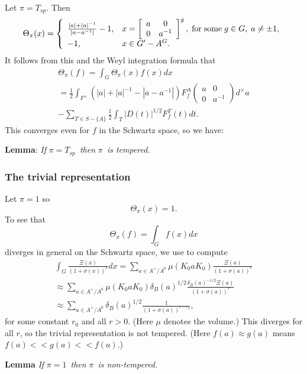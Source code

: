 \documentclass[11pt, a4paper]{article}
\begin{document}
Let $\pi =T_{sp}$. Then
\[
\Theta _\pi (x)=\left\{ 
\begin{array}{ll}
\frac{|a|+|a|^{-1}}{|a-a^{-1}|}-1, & x=\left[ 
\begin{array}{cc}
a & 0 \\ 
0 & a^{-1}
\end{array}
\right] ^g,\;{\rm for\;some}\;g\in G,\;a\neq \pm 1, \\ 
-1, & x\in G^{\prime }-A^G.
\end{array}
\right.
\]
It follows from this and the Weyl integration formula that
\[
\begin{array}{c}
\Theta _\pi (f)=\int_G\Theta _\pi (x)f(x)dx \\ 
=\frac 12\int_{F^{\times }}(|a|+|a|^{-1}-|a-a^{-1}|)F_f^A\left( 
\begin{array}{cc}
a & 0 \\ 
0 & a^{-1}
\end{array}
\right)d^{\times }a \\ 
-\sum_{T\in S-\{A\}}\frac 12\int_T|D(t)|^{1/2}F_f^T(t)dt.
\end{array}
\]
This converges even for $f$ in the Schwartz space, so we have:

{\bf Lemma}: {\em If }$\pi =T_{sp}${\em \ then }$\pi ${\em \ is tempered.}

\subsubsection{The trivial representation}

Let $\pi =1$ so
\[
\Theta _\pi (x)=1.
\]
To see that
\[
\Theta _\pi (f)=\int_Gf(x)dx
\]
diverges in general on the Schwartz space, we use \cite[Lemma~4.2.5]{S} to
compute
\[
\begin{array}{c}
\int_G \frac{\Xi (x)}{(1+\sigma (x))^r}dx=\sum_{a\in A^{+}/A^0}\mu (K_0aK_0)%
\frac{\Xi (a)}{(1+\sigma (a))^r} \\ 
\approx \sum_{a\in A^{+}/A^0}\mu (K_0aK_0)\delta _B(a)^{1/2} \frac{\delta
_B(a)^{-1/2}\Xi (a)}{(1+\sigma (a))^r} \\ 
\approx \sum_{a\in A^{+}/A^0}\delta _B(a)^{1/2}\frac 1{(1+\sigma
(a))^{r-r_0}},
\end{array}
\]
for some constant $r_0$ and all $r>0$. (Here $\mu $ denotes the volume.)
This diverges for all $r$, so the trivial representation is not tempered.
(Here $f(a)\approx g(a)$ means $f(a)<<g(a)<<f(a)$.)

{\bf Lemma} {\em If }$\pi =1${\em \ then }$\pi ${\em \ is non-tempered.}
\end{document}
